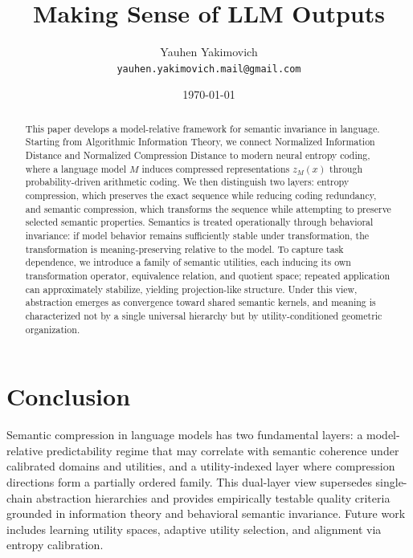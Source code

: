 \documentclass[11pt]{article}
\title{Making Sense of LLM Outputs}
\author{Yauhen Yakimovich \\
  \texttt{yauhen.yakimovich.mail@gmail.com}}
\date{\today}
\begin{document}
\maketitle

\begin{abstract}
This paper develops a model-relative framework for semantic invariance in language.
Starting from Algorithmic Information Theory, we connect Normalized Information Distance and Normalized Compression Distance to modern neural entropy coding, where a language model $M$ induces compressed representations $z_M(x)$ through probability-driven arithmetic coding.
We then distinguish two layers: entropy compression, which preserves the exact sequence while reducing coding redundancy, and semantic compression, which transforms the sequence while attempting to preserve selected semantic properties.
Semantics is treated operationally through behavioral invariance: if model behavior remains sufficiently stable under transformation, the transformation is meaning-preserving relative to the model.
To capture task dependence, we introduce a family of semantic utilities, each inducing its own transformation operator, equivalence relation, and quotient space; repeated application can approximately stabilize, yielding projection-like structure.
Under this view, abstraction emerges as convergence toward shared semantic kernels, and meaning is characterized not by a single universal hierarchy but by utility-conditioned geometric organization.
\end{abstract}






\section{Conclusion}
Semantic compression in language models has two fundamental layers: a model-relative predictability regime that may correlate with semantic coherence under calibrated domains and utilities, and a utility-indexed layer where compression directions form a partially ordered family. This dual-layer view supersedes single-chain abstraction hierarchies and provides empirically testable quality criteria grounded in information theory and behavioral semantic invariance. Future work includes learning utility spaces, adaptive utility selection, and alignment via entropy calibration.



\end{document}
